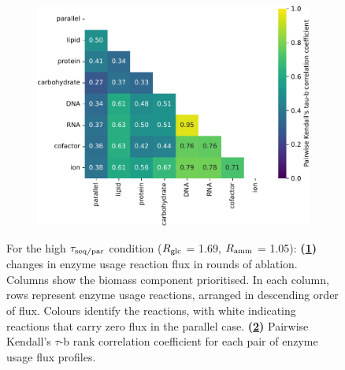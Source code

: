 \begin{figure}[htbp!]
\begin{subfigure}[t]{0.45\textwidth}
    \caption{
    }
    \label{fig:model-rank-glc-highratio-rank}
  \end{subfigure}%
  \begin{subfigure}[t]{0.45\textwidth}
  \centering
    \includegraphics[width=\linewidth]{CompareEnzUse_glc01p69_pyrUnres_amm01p05_2.pdf}
    \caption{
    }
    \label{fig:model-rank-glc-highratio-kendall}
  \end{subfigure}%

  \caption[
    Changes in enzyme usage reaction flux and Kendall's $\tau$-b rank correlation coefficient for each pair, $\exchrate{glc}$ = \SI{1.69}{\mmolgdwh}, $\exchrate{amm}$ = \SI{1.05}{\mmolgdwh}.
    ]{
    For the high $\tau_{\mathrm{seq}/\mathrm{par}}$ condition ($\exchrate{glc}$ = \SI{1.69}{\mmolgdwh}, $\exchrate{amm}$ = \SI{1.05}{\mmolgdwh}):
    \textbf{(\ref{fig:model-rank-glc-highratio-rank})}
    changes in enzyme usage reaction flux in rounds of ablation.
    Columns show the biomass component prioritised.
    In each column, rows represent enzyme usage reactions, arranged in descending order of flux.
    Colours identify the reactions, with white indicating reactions that carry zero flux in the parallel case.
    \textbf{(\ref{fig:model-rank-glc-highratio-kendall})}
    Pairwise Kendall's $\tau$-b rank correlation coefficient \parencite{kendallTREATMENTTIESRANKING1945} for each pair of enzyme usage flux profiles.
  }
  \label{fig:model-rank-glc-highratio}
\end{figure}

